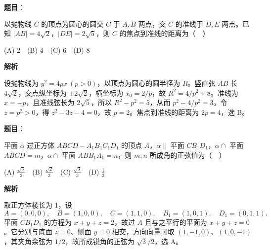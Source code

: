 \begin{answer}

\textbf{题目}：

以抛物线 $C$ 的顶点为圆心的圆交 $C$ 于 $A,B$ 两点，交 $C$ 的准线于 $D,E$ 两点。已知 $|AB|=4\sqrt2$，$|DE|=2\sqrt5$，则 $C$ 的焦点到准线的距离为（　）

   (A) $2$　(B) $4$　(C) $6$　(D) $8$

\textbf{解析}

设抛物线为 \(y^2=4px\ (p>0)\)，以顶点为圆心的圆半径为 \(R\)。竖直弦 \(AB\) 长 \(4\sqrt2\)，交点纵坐标为 \(\pm2\sqrt2\)，横坐标为 \(x_0=2/p\)，故 \(R^2=4/p^2+8\)。准线为 \(x=-p\)，且准线弦长为 \(2\sqrt5\)，所以 \(R^2-p^2=5\)，从而 \(p^2-4/p^2=3\)。令 \(z=p^2>0\)，得 \(z^2-3z-4=0\)，故 \(p=2\)。焦点到准线的距离为 \(2p=4\)，选 B。


\end{answer}
\begin{answer}

\textbf{题目}：

平面 $\alpha$ 过正方体 $ABCD-A_1B_1C_1D_1$ 的顶点 $A$，$\alpha\parallel$ 平面 $CB_1D_1$，$\alpha\cap$ 平面 $ABCD=m$，$\alpha\cap$ 平面 $ABB_1A_1=n$，则 $m,n$ 所成角的正弦值为（　）

   (A) $\frac{\sqrt3}{2}$　(B) $\frac{\sqrt2}{2}$　(C) $\frac{\sqrt3}{3}$　(D) $\frac13$

\textbf{解析}

取正方体棱长为 1，设
\nopagebreak[4]
\[
A=(0,0,0),\quad B=(1,0,0),\quad C=(1,1,0),\quad
B_1=(1,0,1),\quad D_1=(0,1,1).
\]
平面 \(CB_1D_1\) 的方程为 \(x+y+z=2\)，故过 \(A\) 且与之平行的平面为 \(x+y+z=0\)。它分别与底面 \(z=0\)、侧面 \(y=0\) 相交，方向向量可取 \((1,-1,0)\)、\((1,0,-1)\)，其夹角余弦为 \(1/2\)，故所成锐角的正弦为 \(\sqrt3/2\)，选 A。


\end{answer}
